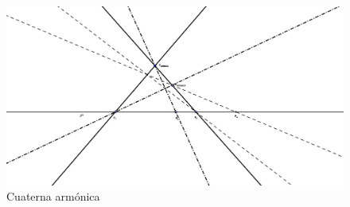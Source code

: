 \begin{figure}[]
	\centering
	\includegraphics[scale=.4]{Graficos/RazonDoble/razon_doble.eps}
	\caption{Cuaterna armónica}
	\label{C5_img_cuaterna_armonica}
\end{figure}

